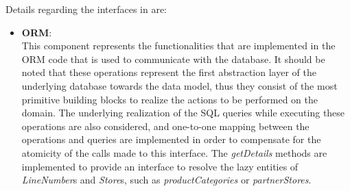 Details regarding the interfaces in  are:
\begin{itemize}
    \item \textbf{ORM}: \\
    This component represents the functionalities that are implemented in the ORM code that is used to communicate with the database.
    It should be noted that these operations represent the first abstraction layer of the underlying database towards the data model, thus they consist of the most primitive building blocks to realize the actions to be performed on the domain.
    The underlying realization of the SQL queries while executing these operations are also considered, and one-to-one mapping between the operations and queries are implemented in order to compensate for the atomicity of the calls made to this interface.
    The \textit{getDetails} methods are implemented to provide an interface to resolve the lazy entities of \textit{LineNumber}s and \textit{Store}s, such as \textit{productCategories} or \textit{partnerStores}.


\end{itemize}
